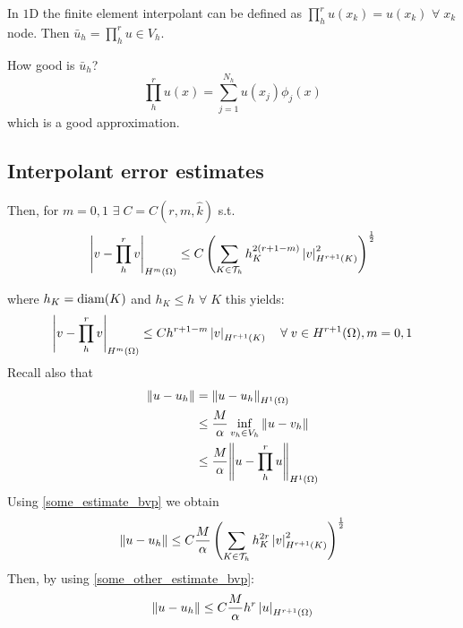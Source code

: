 In \(1\)D the finite element interpolant can be defined as \(\prod_{h}^{r} u(x_k) = u(x_k)\) \(\forall \; x_k\) node. Then \(\bar{u}_h = \prod_{h}^r u \in V_h\). 

How good is \(\bar{u}_h\)? 
\[
    \prod_{h}^{r} u(x) = \sum_{j=1}^{N_h} u(x_j)\phi_j(x)
\]
which is a good approximation.
\subsection*{Interpolant error estimates}
Then, for \(m=0,1\) \(\exists \; C = C(r,m,\hat{k})\) s.t.
\begin{equation}
    \left\lvert v-\prod_{h}^{r}v\right\rvert_{H^m(\Omega)} \leq C\left(\sum_{K \in \mathcal{T}_h}h_K^{2(r+1-m)}\left\lvert v\right\rvert_{H^{r+1}(K)}^2\right)^{\frac{1}{2}} \label{some_estimate_bvp}
\end{equation}
    

where \(h_K = \text{diam}(K)\) and \(h_K \leq h\) \(\forall \; K\) this yields:
\begin{equation}
    \left\lvert v-\prod_{h}^{r}v\right\rvert_{H^m(\Omega)} \leq C h^{r+1-m}\left\lvert v\right\rvert_{H^{r+1}(K)} \quad \forall \; v \in H^{r+1}(\Omega), m = 0,1 \label{some_other_estimate_bvp}
\end{equation}
Recall also that 
\begin{align*}
    \norm{u-u_h} &= \norm{u-u_h}_{H^1(\Omega)} \\
    &\leq \frac{M}{\alpha} \inf_{v_h \in V_h} \norm{u-v_h} \\
    &\leq \frac{M}{\alpha} \norm{u-\prod_h^r u}_{H^1(\Omega)}
\end{align*}
Using \eqref{some_estimate_bvp} we obtain
\begin{equation}
    \norm{u-u_h} \leq C\frac{M}{\alpha}\left(\sum_{K \in \mathcal{T}_h}h_K^{2r}\left\lvert v\right\rvert_{H^{r+1}(K)}^2\right)^{\frac{1}{2}} \label{first_estimate_H1_bvp}
\end{equation}
Then, by using \eqref{some_other_estimate_bvp}:
\begin{equation}
    \norm{u-u_h} \leq C \frac{M}{\alpha} h^r \left\lvert u\right\rvert_{H^{r+1}(\Omega)} \label{second_estimate_H1_bvp}
\end{equation}

